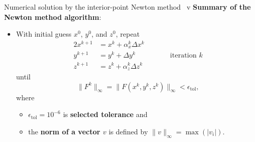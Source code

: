 \begin{frame}{Numerical solution by the interior-point Newton method \, v}
\vskip 10pt
\alert{\bf Summary of the Newton method algorithm}: \\[5pt]

\begin{itemize} 
%
\item With initial guess $x^{0}$, $y^{0}$, and $z^{0}$, repeat
%
\begin{alignat*}{2}
x^{k+1} & =x^{k}+\alpha_{x}^{k}\Delta x^{k}\\
y^{k+1} & =y^{k}+\Delta y^{k} & \qquad & \text{iteration }k\\
z^{k+1} & =z^{k}+\alpha_{z}^{k}\Delta z^{k}
\end{alignat*}
%
%
until
\[
\|F^{k}\|_{\infty}=\|F(x^{k},y^{k},z^{k})\|_{\infty}<\epsilon_{\mathrm{tol}},
\]
where
% 
\begin{itemize} 
\item $\epsilon_{\text{tol}}=10^{-6}$ is {\bf selected tolerance} and \item the {\bf norm of a vector $v$} is defined by
%
$
\|v\|_{\infty}=\max(|v_{i}|).
$
\end{itemize} 

\end{itemize} 

\end{frame}
%
%	
